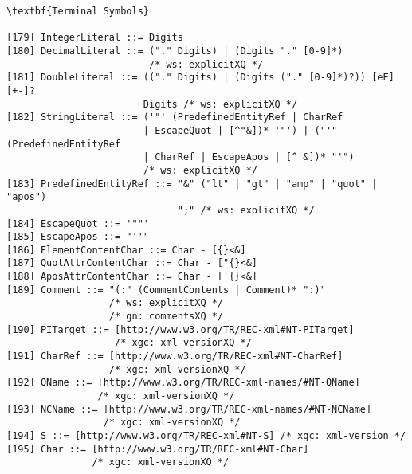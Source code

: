 \begin{verbatim}
\textbf{Terminal Symbols}

[179] IntegerLiteral ::= Digits
[180] DecimalLiteral ::= ("." Digits) | (Digits "." [0-9]*)	
                         /* ws: explicitXQ */
[181] DoubleLiteral ::= (("." Digits) | (Digits ("." [0-9]*)?)) [eE] [+-]?
                        Digits /* ws: explicitXQ */
[182] StringLiteral ::= ('"' (PredefinedEntityRef | CharRef 
                        | EscapeQuot | [^"&])* '"') | ("'" (PredefinedEntityRef
                        | CharRef | EscapeApos | [^'&])* "'")	
                        /* ws: explicitXQ */
[183] PredefinedEntityRef ::= "&" ("lt" | "gt" | "amp" | "quot" | "apos")
                              ";" /* ws: explicitXQ */
[184] EscapeQuot ::= '""'
[185] EscapeApos ::= "''"
[186] ElementContentChar ::= Char - [{}<&]
[187] QuotAttrContentChar ::= Char - ["{}<&]
[188] AposAttrContentChar ::= Char - ['{}<&]
[189] Comment ::= "(:" (CommentContents | Comment)* ":)"
                  /* ws: explicitXQ */
                  /* gn: commentsXQ */
[190] PITarget ::= [http://www.w3.org/TR/REC-xml#NT-PITarget]
                   /* xgc: xml-versionXQ */
[191] CharRef ::= [http://www.w3.org/TR/REC-xml#NT-CharRef] 
                  /* xgc: xml-versionXQ */
[192] QName ::= [http://www.w3.org/TR/REC-xml-names/#NT-QName]
                /* xgc: xml-versionXQ */
[193] NCName ::= [http://www.w3.org/TR/REC-xml-names/#NT-NCName]
                 /* xgc: xml-versionXQ */
[194] S ::= [http://www.w3.org/TR/REC-xml#NT-S] /* xgc: xml-version */
[195] Char ::= [http://www.w3.org/TR/REC-xml#NT-Char] 
               /* xgc: xml-versionXQ */
\end{verbatim}